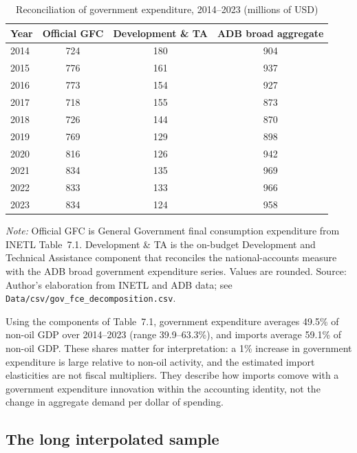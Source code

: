 \documentclass[11pt,a4paper]{article}
\begin{document}
\begin{table}[htbp]
\centering
\small
\caption{Reconciliation of government expenditure, 2014--2023 (millions of USD)}
\label{tab:gov_decomposition}
\begin{tabular}{@{}lccc@{}}
\toprule
Year & Official GFC & Development \& TA & ADB broad aggregate \\
\midrule
2014 & 724 & 180 & 904 \\
2015 & 776 & 161 & 937 \\
2016 & 773 & 154 & 927 \\
2017 & 718 & 155 & 873 \\
2018 & 726 & 144 & 870 \\
2019 & 769 & 129 & 898 \\
2020 & 816 & 126 & 942 \\
2021 & 834 & 135 & 969 \\
2022 & 833 & 133 & 966 \\
2023 & 834 & 124 & 958 \\
\bottomrule
\end{tabular}
\par\vspace{0.3em}
\begin{minipage}{0.95\textwidth}
\footnotesize\textit{Note:} Official GFC is General Government final consumption expenditure from INETL Table~7.1. Development \& TA is the on-budget Development and Technical Assistance component that reconciles the national-accounts measure with the ADB broad government expenditure series. Values are rounded. Source: Author's elaboration from INETL and ADB data; see \texttt{Data/csv/gov\_fce\_decomposition.csv}.
\end{minipage}
\end{table}

Using the components of Table~7.1, government expenditure averages 49.5\% of non-oil GDP over 2014--2023 (range 39.9--63.3\%), and imports average 59.1\% of non-oil GDP. These shares matter for interpretation: a 1\% increase in government expenditure is large relative to non-oil activity, and the estimated import elasticities are not fiscal multipliers. They describe how imports comove with a government expenditure innovation within the accounting identity, not the change in aggregate demand per dollar of spending.

\subsection{The long interpolated sample}
\label{sec:long}
\end{document}
